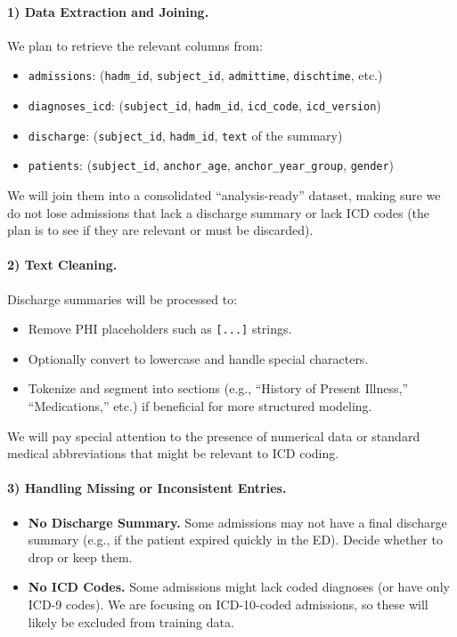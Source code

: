 \paragraph{1) Data Extraction and Joining.}
We plan to retrieve the relevant columns from:
\begin{itemize}
    \item \texttt{admissions}: (\texttt{hadm\_id}, \texttt{subject\_id}, \texttt{admittime}, \texttt{dischtime}, etc.)
    \item \texttt{diagnoses\_icd}: (\texttt{subject\_id}, \texttt{hadm\_id}, \texttt{icd\_code}, \texttt{icd\_version})
    \item \texttt{discharge}: (\texttt{subject\_id}, \texttt{hadm\_id}, \texttt{text} of the summary)
    \item \texttt{patients}: (\texttt{subject\_id}, \texttt{anchor\_age}, \texttt{anchor\_year\_group}, \texttt{gender})
\end{itemize}
We will join them into a consolidated “analysis-ready” dataset, making sure we do not lose admissions that lack a discharge summary or lack ICD codes (the plan is to see if they are relevant or must be discarded).

\paragraph{2) Text Cleaning.}
Discharge summaries will be processed to:
\begin{itemize}
    \item Remove PHI placeholders such as \texttt{[\*\*...\*\*]} strings.
    \item Optionally convert to lowercase and handle special characters.
    \item Tokenize and segment into sections (e.g., “History of Present Illness,” “Medications,” etc.) if beneficial for more structured modeling.
\end{itemize}
We will pay special attention to the presence of numerical data or standard medical abbreviations that might be relevant to ICD coding.

\paragraph{3) Handling Missing or Inconsistent Entries.}
\begin{itemize}
    \item \textbf{No Discharge Summary.} Some admissions may not have a final discharge summary (e.g., if the patient expired quickly in the ED). Decide whether to drop or keep them.
    \item \textbf{No ICD Codes.} Some admissions might lack coded diagnoses (or have only ICD-9 codes). We are focusing on ICD-10-coded admissions, so these will likely be excluded from training data.
\end{itemize}

